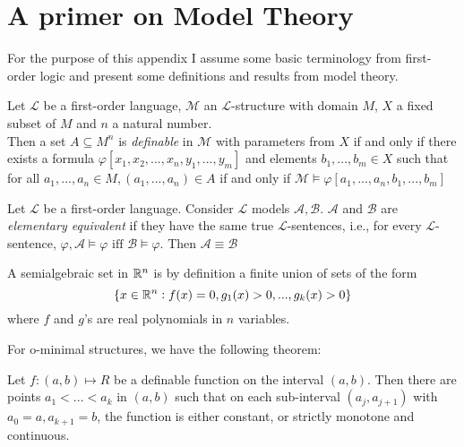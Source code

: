 \chapter{A primer on Model Theory}
\label{chap:model-theory}
For the purpose of this appendix I assume some basic terminology from first-order logic and present some definitions and results from model theory.

\begin{definition}
    \label{def:definable-set}
    Let $\mathcal{L}$ be a first-order language, $\mathcal{M}$ an $\mathcal{L}$-structure with domain $M$, $X$ a fixed subset of $M$ and $n$ a natural number. \\
    Then a set $A\subseteq M^n$ is \textit{definable} in $\mathcal{M}$ with parameters from $X$ if and only if there exists a formula $\varphi[x_1,x_2,...,x_n,y_1,...,y_m]$ and elements $b_1,...,b_m\in X$ such that for all $a_1,...,a_n\in M, (a_1,...,a_n)\in A$ if and only if $\mathcal{M}\models\varphi[a_1,...,a_n,b_1,...,b_m]$
\end{definition}

\begin{definition}
    \label{def:elementary-equivalence}
    Let $\mathcal{L}$ be a first-order language. Consider $\mathcal{L}$ models $\mathcal{A}, \mathcal{B}$. $\mathcal{A}$ and $\mathcal{B}$ are \textit{elementary equivalent} if they have the same true $\mathcal{L}$-sentences, i.e., for every $\mathcal{L}$-sentence, $\varphi, \mathcal{A}\models\varphi \text{ iff }\mathcal{B}\models\varphi$. Then $\mathcal{A}\equiv\mathcal{B}$ 
\end{definition}

\begin{definition}
    \label{def:semialgebraic-set}
    A semialgebraic set in $\mathbb{R}^n$ is by definition a finite union of sets of the form
    \begin{equation*}
        \{x\in\mathbb{R}^n : f(x) = 0, g_1(x)>0,...,g_k(x)>0\}
    \end{equation*}
    where $f$ and $g$'s are real polynomials in $n$ variables.
\end{definition}

For o-minimal structures, we have the following theorem:
\begin{theorem}[Monotinicity]
    \label{thm:monotonicity}
    Let $f:(a,b)\mapsto R$ be a definable function on the interval $(a,b).$ Then there are points $a_1 < ... < a_k$ in $(a,b)$ such that on each sub-interval $(a_j, a_{j+1})$ with $a_0 = a, a_{k+1} = b$, the function is either constant, or strictly monotone and continuous.
\end{theorem}

